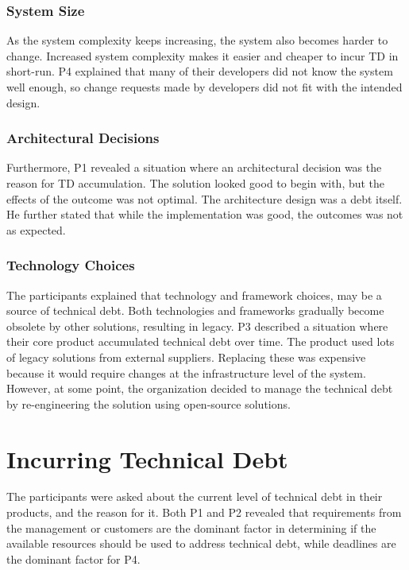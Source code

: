 \subsubsection{System Size}
As the system complexity keeps increasing, the system also becomes harder to change. Increased system complexity makes it easier and cheaper to incur TD in short-run. P4 explained that many of their developers did not know the system well enough, so change requests made by developers did not fit with the intended design.

\subsubsection{Architectural Decisions}
Furthermore, P1 revealed a situation where an architectural decision was the reason for TD accumulation. The solution looked good to begin with, but the effects of the outcome was not optimal. The architecture design was a debt itself. He further stated that while the implementation was good, the outcomes was not as expected.

\subsubsection{Technology Choices}
The participants explained that technology and framework choices, may be a source of technical debt. Both technologies and frameworks gradually become obsolete by other solutions, resulting in legacy. P3 described a situation where their core product accumulated technical debt over time. The product used lots of legacy solutions from external suppliers. Replacing these was expensive because it would require changes at the infrastructure level of the system. However, at some point, the organization decided to manage the technical debt by re-engineering the solution using open-source solutions.




\section{Incurring Technical Debt}
\label{sec:prior}
The participants were asked about the current level of technical debt in their products, and the reason for it. Both P1 and P2 revealed that requirements from the management or customers are the dominant factor in determining if the available resources should be used to address technical debt, while deadlines are the dominant factor for P4. 

